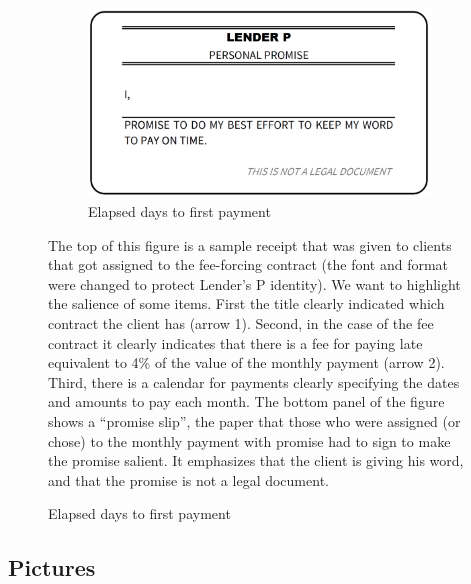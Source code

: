 \documentclass[11pt]{article}
\begin{document}
\begin{figure}[H]
\begin{center}
    \vspace{3ex}
    \begin{subfigure}{0.45\textwidth}
    \caption{Elapsed days to first payment}
        \centering
        \includegraphics[width=\textwidth]{Figuras/Personal Promise.png}
    \end{subfigure}
    \end{center}
    \scriptsize
        The top of this figure is a sample receipt that was given to clients that got assigned to the fee-forcing contract (the font and format were changed to protect Lender's P identity). We want to highlight the salience of some items. First the title clearly indicated which contract the client has (arrow 1). Second, in the case of the fee contract it clearly indicates that there is a fee for paying late equivalent to 4\% of the value of the monthly payment (arrow 2). Third, there is a calendar for payments clearly specifying the dates and amounts to pay each month. The bottom panel of the figure shows a ``promise slip'', the paper that those who were assigned (or chose) to the monthly payment with promise had to sign to make the promise salient. It emphasizes that the client is giving his word, and that the promise is not a legal document.
\end{figure}



\subsection{Pictures}
\end{document}
